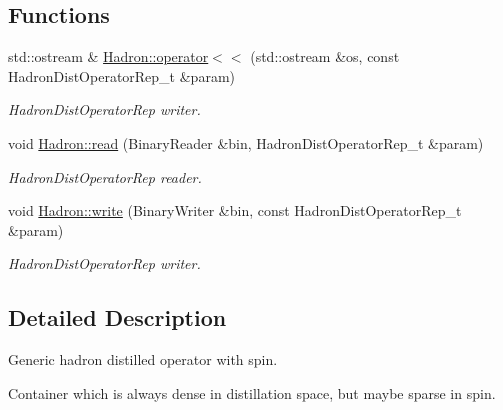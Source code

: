 \subsection*{Functions}
\begin{DoxyCompactItemize}
\item 
std\+::ostream \& \mbox{\hyperlink{namespaceHadron_a4ff4eac2687982e6a251bf3524940b01}{Hadron\+::operator$<$$<$}} (std\+::ostream \&os, const Hadron\+Dist\+Operator\+Rep\+\_\+t \&param)
\begin{DoxyCompactList}\small\item\em Hadron\+Dist\+Operator\+Rep writer. \end{DoxyCompactList}\item 
void \mbox{\hyperlink{namespaceHadron_adeba574c3428db28a2e7054d5f4d32d6}{Hadron\+::read}} (Binary\+Reader \&bin, Hadron\+Dist\+Operator\+Rep\+\_\+t \&param)
\begin{DoxyCompactList}\small\item\em Hadron\+Dist\+Operator\+Rep reader. \end{DoxyCompactList}\item 
void \mbox{\hyperlink{namespaceHadron_a9edaeb80eb507096c7529be211efa667}{Hadron\+::write}} (Binary\+Writer \&bin, const Hadron\+Dist\+Operator\+Rep\+\_\+t \&param)
\begin{DoxyCompactList}\small\item\em Hadron\+Dist\+Operator\+Rep writer. \end{DoxyCompactList}\end{DoxyCompactItemize}


\subsection{Detailed Description}
Generic hadron distilled operator with spin. 

Container which is always dense in distillation space, but maybe sparse in spin. 